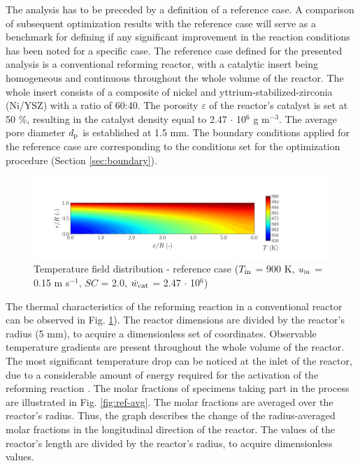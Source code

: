 \documentclass[preprint,12pt]{elsarticle}
\begin{document}
The analysis has to be preceded by a definition of a reference case. A comparison of subsequent optimization results with the reference case will serve as a benchmark for defining if any significant improvement in the reaction conditions has been noted for a specific case. The reference case defined for the presented analysis is a conventional reforming reactor, with a catalytic insert being homogeneous and continuous throughout the whole volume of the reactor. The whole insert consists of a composite of nickel and yttrium-stabilized-zirconia (Ni/YSZ) with a ratio of 60:40. The porosity $\varepsilon$ of the reactor's catalyst is set at 50 \%, resulting in the catalyst density equal to 2.47 $\cdot$ 10$^6$ g m$^{-3}$. The average pore diameter $d_{\rm{p}}$ is established at 1.5 mm. The boundary conditions applied for the reference case are corresponding to the conditions set for the optimization procedure (Section \ref{sec:boundary}).

\begin{figure}[h]
\centering
\includegraphics[width=190mm]{ref-Tfield.png}
\caption{\label{fig:ref-TField} Temperature field distribution - reference case ($T_{\rm{in}}$ = 900 K, $u_{\rm{in}}$ = 0.15 m s$^{-1}$, $SC$ = 2.0, $\dot{w}_{\rm{cat}}$ = 2.47 $\cdot$ 10$^{6}$)}
\end{figure}

The thermal characteristics of the reforming reaction in a conventional reactor can be observed in Fig. \ref{fig:ref-TField}). The reactor dimensions are divided by the reactor's radius (5 mm), to acquire a dimensionless set of coordinates. Observable temperature gradients are present throughout the whole volume of the reactor. The most significant temperature drop can be noticed at the inlet of the reactor, due to a considerable amount of energy required for the activation of the reforming reaction \cite{Xu1989, Pajak2018}. The molar fractions of specimens taking part in the process are illustrated in Fig. \ref{fig:ref-avg}. The molar fractions are averaged over the reactor's radius. Thus, the graph describes the change of the radius-averaged molar fractions in the longitudinal direction of the reactor. The values of the reactor's length are divided by the reactor's radius, to acquire dimensionless values.  
\end{document}
